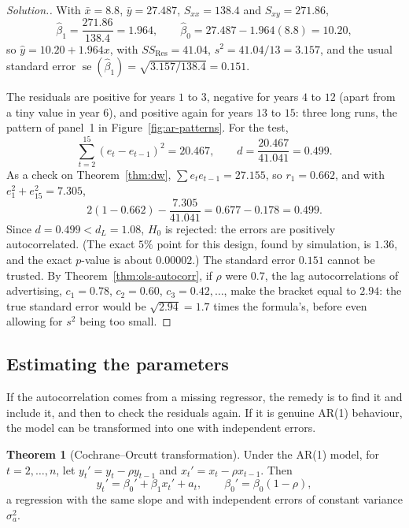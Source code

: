 \documentclass[11pt,a4paper]{article}
\numberwithin{equation}{section}
\theoremstyle{definition}
\newtheorem{thm}{Theorem}[subsection]
\newenvironment{solution}
  {\renewcommand{\qedsymbol}{}\begin{proof}[\textit{Solution}.]}
  {\end{proof}}
\begin{document}
\begin{solution}
With $\bar x = 8.8$, $\bar y = 27.487$, $S_{xx} = 138.4$ and $S_{xy} = 271.86$,
\[
\hat\beta_1 = \frac{271.86}{138.4} = 1.964 , \qquad \hat\beta_0 = 27.487 - 1.964(8.8) = 10.20 ,
\]
so $\hat y = 10.20 + 1.964x$, with $SS_{\mathrm{Res}} = 41.04$, $s^2 = 41.04/13 = 3.157$, and the usual standard error
$\operatorname{se}(\hat\beta_1) = \sqrt{3.157/138.4} = 0.151$.

The residuals are positive for years $1$ to $3$, negative for years $4$ to $12$ (apart from a tiny value in year $6$), and positive
again for years $13$ to $15$: three long runs, the pattern of panel~1 in Figure~\ref{fig:ar-patterns}. For the test,
\[
\sum_{t=2}^{15}(e_t - e_{t-1})^2 = 20.467 , \qquad d = \frac{20.467}{41.041} = 0.499 .
\]
As a check on Theorem~\ref{thm:dw}, $\sum e_te_{t-1} = 27.155$, so $r_1 = 0.662$, and with $e_1^2 + e_{15}^2 = 7.305$,
\[
2(1 - 0.662) - \frac{7.305}{41.041} = 0.677 - 0.178 = 0.499 .
\]
Since $d = 0.499 < d_L = 1.08$, $H_0$ is rejected: the errors are positively autocorrelated. (The exact $5\%$ point for this
design, found by simulation, is $1.36$, and the exact $p$-value is about $0.00002$.) The standard error $0.151$ cannot be
trusted. By Theorem~\ref{thm:ols-autocorr}, if $\rho$ were $0.7$, the lag autocorrelations of advertising, $c_1 = 0.78$,
$c_2 = 0.60$, $c_3 = 0.42, \dots$, make the bracket equal to $2.94$: the true standard error would be $\sqrt{2.94} = 1.7$ times the
formula's, before even allowing for $s^2$ being too small.
\end{solution}

\subsection{Estimating the parameters}
If the autocorrelation comes from a missing regressor, the remedy is to find it and include it, and then to
check the residuals again. If it is genuine AR(1) behaviour, the model can be transformed into one with
independent errors.

\begin{thm}[Cochrane--Orcutt transformation]\label{thm:cochrane-orcutt}
Under the AR(1) model, for $t = 2, \dots, n$, let $y_t' = y_t - \rho y_{t-1}$ and $x_t' = x_t - \rho x_{t-1}$. Then
\[
y_t' = \beta_0' + \beta_1x_t' + a_t , \qquad \beta_0' = \beta_0(1 - \rho) ,
\]
a regression with the same slope and with independent errors of constant variance $\sigma_a^2$.
\end{thm}
\end{document}
